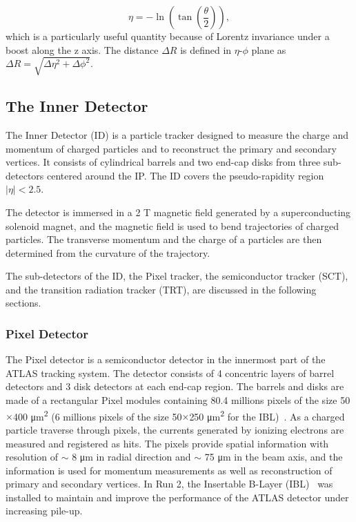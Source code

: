 \begin{equation}
    \label{eq:eta}
    \eta = -\ln (\tan (\frac{\theta}{2})),
\end{equation}
%
which is a particularly useful quantity because of Lorentz invariance under a boost along the z axis. The distance $\Delta R$ is defined in $\eta$-$\phi$ plane as $\Delta R = \sqrt{\Delta \eta^{2} + \Delta \phi^{2}}$.

\subsection{The Inner Detector}
\label{sec:atlas:id}
The Inner Detector (ID) is a particle tracker designed to measure the charge and momentum of charged particles and to reconstruct the primary and secondary vertices. It consists of cylindrical barrels and two end-cap disks from three sub-detectors centered around the IP. The ID covers the pseudo-rapidity region $|\eta| < 2.5$. 

The detector is immersed  in a 2 T magnetic field generated by a superconducting solenoid magnet, and the magnetic field is used to bend trajectories of charged particles. The transverse momentum and the charge of a particles are then determined from the curvature of the trajectory.

The sub-detectors of the ID, the Pixel tracker, the semiconductor tracker (SCT), and the transition radiation tracker (TRT), are discussed in the following sections.

\subsubsection{Pixel Detector}
\label{sec:atlas:pixel}

The Pixel detector is a semiconductor detector in the innermost part of the ATLAS tracking system. The detector consists of 4 concentric layers of barrel detectors and 3 disk detectors at each end-cap region. The barrels and disks are made of a rectangular Pixel modules containing 80.4 millions pixels of the size 50$\times$400 \si{\micro\meter^{2}} (6 millions pixels of the size 50$\times$250 \si{\micro\meter^{2}} for the IBL)~\cite{1748-0221-10-06-C06012}. As a charged particle traverse through pixels, the currents generated by ionizing electrons are measured and registered as hits. The pixels provide spatial information with resolution of $\sim$ 8 \si{\micro\meter} in radial direction and $\sim$ 75 \si{\micro\meter} in the beam axis, and the information is used for momentum measurements as well as reconstruction of primary and secondary vertices. In Run 2, the Insertable B-Layer (IBL)~\cite{Abbott:2307576} was installed to maintain and improve the performance of the ATLAS detector under increasing pile-up.

